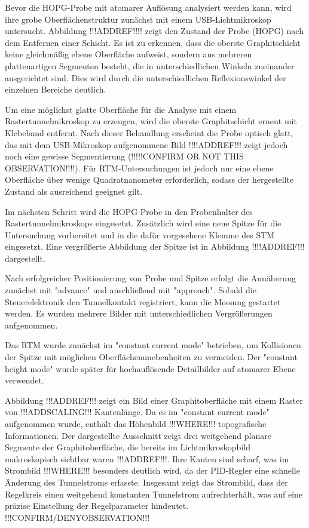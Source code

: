 Bevor die HOPG-Probe mit atomarer Auflösung analysiert werden kann, wird ihre grobe Oberflächenstruktur zunächst mit einem USB-Lichtmikroskop untersucht. Abbildung !!!ADDREF!!!! zeigt den Zustand der Probe (HOPG) nach dem Entfernen einer Schicht. Es ist zu erkennen, dass die oberste Graphitschicht keine gleichmäßig ebene Oberfläche aufweist, sondern aus mehreren plattenartigen Segmenten besteht, die in unterschiedlichen Winkeln zueinander ausgerichtet sind. Dies wird durch die unterschiedlichen Reflexionswinkel der einzelnen Bereiche deutlich.

Um eine möglichst glatte Oberfläche für die Analyse mit einem Rastertunnelmikroskop zu erzeugen, wird die oberste Graphitschicht erneut mit Klebeband entfernt. Nach dieser Behandlung erscheint die Probe optisch glatt, das mit dem USB-Mikroskop aufgenommene Bild !!!!ADDREF!!! zeigt jedoch noch eine gewisse Segmentierung (!!!!!CONFIRM OR NOT THIS OBSERVATION!!!!). Für RTM-Untersuchungen ist jedoch nur eine ebene Oberfläche über wenige Quadratnanometer erforderlich, sodass der hergestellte Zustand als ausreichend geeignet gilt.

Im nächsten Schritt wird die HOPG-Probe in den Probenhalter des Rastertunnelmikroskops eingesetzt. Zusätzlich wird eine neue Spitze für die Untersuchung vorbereitet und in die dafür vorgesehene Klemme des STM eingesetzt. Eine vergrößerte Abbildung der Spitze ist in Abbildung !!!!ADDREF!!! dargestellt.


Nach erfolgreicher Positionierung von Probe und Spitze erfolgt die Annäherung zunächst mit "advance" und anschließend mit "approach". Sobald die Steuerelektronik den Tunnelkontakt registriert, kann die Messung gestartet werden. Es wurden mehrere Bilder mit unterschiedlichen Vergrößerungen aufgenommen.

Das RTM wurde zunächst im "constant current mode" betrieben, um Kollisionen der Spitze mit möglichen Oberflächenunebenheiten zu vermeiden. Der "constant height mode" wurde später für hochauflösende Detailbilder auf atomarer Ebene verwendet.

Abbildung !!!ADDREF!!! zeigt ein Bild einer Graphitoberfläche mit einem Raster von !!!ADDSCALING!!! Kantenlänge. Da es im "constant current mode" aufgenommen wurde, enthält das Höhenbild !!!WHERE!!! topografische Informationen. Der dargestellte Ausschnitt zeigt drei weitgehend planare Segmente der Graphitoberfläche, die bereits im Lichtmikroskopbild makroskopisch sichtbar waren !!!ADDREF!!!. Ihre Kanten sind scharf, was im Strombild !!!WHERE!!! besonders deutlich wird, da der PID-Regler eine schnelle Änderung des Tunnelstroms erfasste. Insgesamt zeigt das Strombild, dass der Regelkreis einen weitgehend konstanten Tunnelstrom aufrechterhält, was auf eine präzise Einstellung der Regelparameter hindeutet. !!!CONFIRM/DENYOBSERVATION!!!

